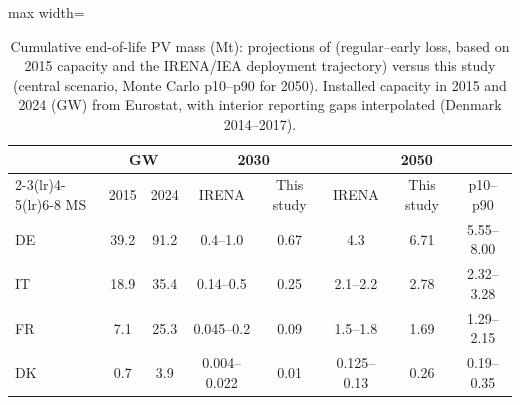 \begin{table}[pos=t]\centering\footnotesize
\caption{Cumulative end-of-life PV mass (Mt): projections of \citet{irena2016} (regular--early loss, based on 2015 capacity and the IRENA/IEA deployment trajectory) versus this study (central scenario, Monte Carlo p10--p90 for 2050). Installed capacity in 2015 and 2024 (GW) from Eurostat, with interior reporting gaps interpolated (Denmark 2014--2017).}
\label{tab:compare}
\begin{adjustbox}{max width=\linewidth}\begin{tabular}{@{}lcccccc c@{}}\toprule
 & \multicolumn{2}{c}{GW} & \multicolumn{2}{c}{2030} & \multicolumn{3}{c}{2050} \\ \cmidrule(lr){2-3}\cmidrule(lr){4-5}\cmidrule(lr){6-8}
MS & 2015 & 2024 & IRENA & This study & IRENA & This study & p10--p90 \\ \midrule
DE & 39.2 & 91.2 & 0.4--1.0 & 0.67 & 4.3 & 6.71 & 5.55--8.00 \\
IT & 18.9 & 35.4 & 0.14--0.5 & 0.25 & 2.1--2.2 & 2.78 & 2.32--3.28 \\
FR & 7.1 & 25.3 & 0.045--0.2 & 0.09 & 1.5--1.8 & 1.69 & 1.29--2.15 \\
DK & 0.7 & 3.9 & 0.004--0.022 & 0.01 & 0.125--0.13 & 0.26 & 0.19--0.35 \\
\bottomrule\end{tabular}\end{adjustbox}\end{table}
